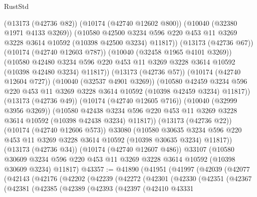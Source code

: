 \begin{lexlean}{RustStd}
\begin{coremodule}
              (@13173 (@42736 @82))
              (@10174 (@42740 @12602 @800))
              (@10040 (@32380 @1971 @4133 @3269))
              (@10580
                @42500
                @3234
                @596
                @220
                @453
                @11
                @3269
                @3228
                @3614
                @10592
                (@10398 @42500 @3234)
                @11817))
            (@13173 (@42736 @67))
            (@10174 (@42740 @12603 @787))
            (@10040 (@32458 @1965 @4101 @3269))
            (@10580
              @42480
              @3234
              @596
              @220
              @453
              @11
              @3269
              @3228
              @3614
              @10592
              (@10398 @42480 @3234)
              @11817))
          (@13173 (@42736 @57))
          (@10174 (@42740 @12604 @727))
          (@10040 (@32537 @4901 @3269))
          (@10580
            @42459
            @3234
            @596
            @220
            @453
            @11
            @3269
            @3228
            @3614
            @10592
            (@10398 @42459 @3234)
            @11817))
        (@13173 (@42736 @49))
        (@10174 (@42740 @12605 @716))
        (@10040 (@32999 @3956 @3269))
        (@10580
          @42438
          @3234
          @596
          @220
          @453
          @11
          @3269
          @3228
          @3614
          @10592
          (@10398 @42438 @3234)
          @11817))
      (@13173 (@42736 @22))
      (@10174 (@42740 @12606 @573))
      @33080
      (@10580
        @30635
        @3234
        @596
        @220
        @453
        @11
        @3269
        @3228
        @3614
        @10592
        (@10398 @30635 @3234)
        @11817))
    (@13173 (@42736 @34))
    (@10174 (@42740 @12607 @486))
    @33107
    (@10580 @30609 @3234 @596 @220 @453 @11 @3269 @3228 @3614 @10592 (@10398 @30609 @3234) @11817)
@43357 := @41890
    (@41951
      (@41997
        (@42039
          (@42077
            (@42143
              (@42176
                (@42202
                  (@42239
                    (@42272
                      (@42301
                        (@42330
                          (@42351
                            (@42367
                              (@42381
                                (@42385
                                  (@42389
                                    (@42393
                                      (@42397
                                        (@42410
                                          @43331

\end{coremodule}
\end{lexlean}
